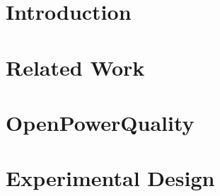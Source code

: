 \documentclass[11pt]{uhthesis}
\author{Sergey Negrashov}
\begin{document}
\maketitle

\begin{frontmatter}


\copyrightpage







\tableofcontents

\listoftables

\listoffigures

\end{frontmatter}

\chapter{Introduction}



\chapter{Related Work}



\chapter{OpenPowerQuality}


\chapter{Experimental Design}




 

  
\end{document}
